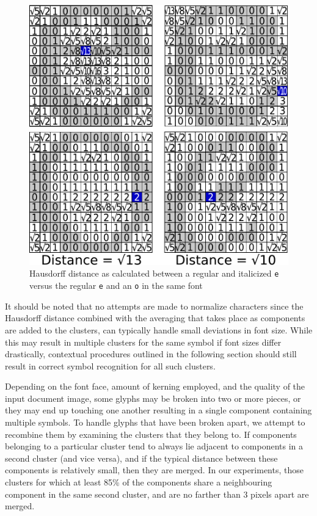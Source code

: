 \documentclass[times, 10pt,twocolumn]{article}
\begin{document}
\begin{figure}[ht]
  \centering
  \includegraphics[scale=.5]{figures/haus_dist_comparisons}
  \caption{Hausdorff distance as calculated between a regular and italicized
  {\tt e} versus the regular {\tt e} and an {\tt o} in the same font}
  \label{hausdist_fig}
\end{figure}

It should be noted that no attempts are made to normalize characters since the
Hausdorff distance combined with the averaging that takes place as components
are added to the clusters, can typically handle small deviations in font size.
While this may result in multiple clusters for the same symbol if font sizes
differ drastically, contextual procedures outlined in the following section
should still result in correct symbol recognition for all such clusters.

Depending on the font face, amount of kerning employed, and the quality of the
input document image, some glyphs may be broken into two or more pieces, or
they may end up touching one another resulting in a single component containing
multiple symbols.
%
To handle glyphs that have been broken apart, we attempt to recombine them by
examining the clusters that they belong to.  If components belonging to a
particular cluster tend to always lie adjacent to components in a second
cluster (and vice versa), and if the typical distance between these components
is relatively small, then they are merged.  In our experiments, those clusters
for which at least 85\% of the components share a neighbouring component in the
same second cluster, and are no farther than 3 pixels apart are merged.
\end{document}
